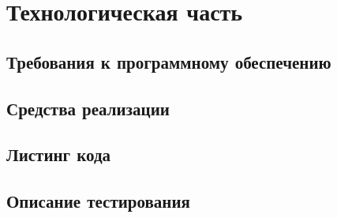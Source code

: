 \chapter{Технологическая часть}
\label{cha:impl}

\section{Требования к программному обеспечению}

\section{Средства реализации}

\section{Листинг кода}

\section{Описание тестирования}


